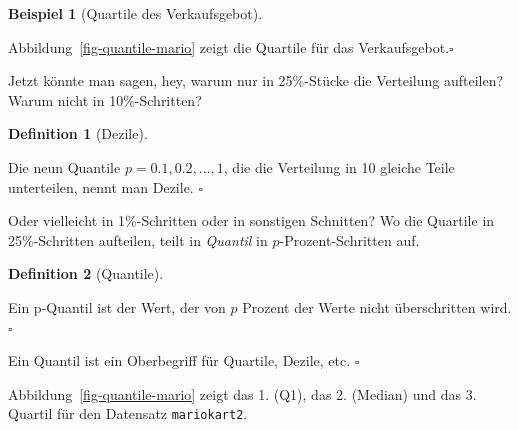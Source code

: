 \documentclass[
  letterpaper,
]{scrbook}
\theoremstyle{definition}
\newtheorem{example}{Beispiel}[chapter]
\theoremstyle{definition}
\newtheorem{definition}{Definition}[chapter]
\theoremstyle{definition}
\theoremstyle{remark}
\begin{document}
\begin{example}[Quartile des
Verkaufsgebot]\protect\hypertarget{exm-mario-qs}{}\label{exm-mario-qs}

Abbildung~\ref{fig-quantile-mario} zeigt die Quartile für das
Verkaufsgebot.\(\square\)

\end{example}

Jetzt könnte man sagen, hey, warum nur in 25\%-Stücke die Verteilung
aufteilen? Warum nicht in 10\%-Schritten?

\begin{definition}[Dezile]\protect\hypertarget{def-dezile}{}\label{def-dezile}

Die neun Quantile \(p= 0.1, 0.2, \ldots, 1\), die die Verteilung in 10
gleiche Teile unterteilen, nennt man Dezile. \(\square\)

\end{definition}

Oder vielleicht in 1\%-Schritten oder in sonstigen Schnitten? Wo die
Quartile in 25\%-Schritten aufteilen, teilt in \emph{Quantil} in
\(p\)-Prozent-Schritten auf.

\begin{definition}[Quantile]\protect\hypertarget{def-quantile}{}\label{def-quantile}

Ein p-Quantil ist der Wert, der von \(p\) Prozent der Werte nicht
überschritten wird.\(\square\)

\end{definition}

\begin{tcolorbox}[enhanced jigsaw, colbacktitle=quarto-callout-note-color!10!white, coltitle=black, bottomrule=.15mm, rightrule=.15mm, arc=.35mm, toptitle=1mm, colframe=quarto-callout-note-color-frame, opacitybacktitle=0.6, left=2mm, leftrule=.75mm, breakable, opacityback=0, bottomtitle=1mm, titlerule=0mm, title=\textcolor{quarto-callout-note-color}{\faInfo}\hspace{0.5em}{Hinweis}, colback=white, toprule=.15mm]

Ein Quantil ist ein Oberbegriff für Quartile, Dezile, etc. \(\square\)

\end{tcolorbox}

Abbildung~\ref{fig-quantile-mario} zeigt das 1. (Q1), das 2. (Median)
und das 3. Quartil für den Datensatz \texttt{mariokart2}.
\end{document}
